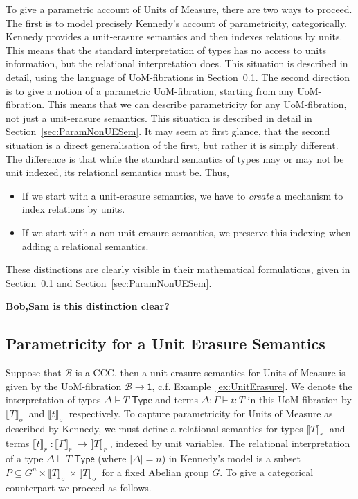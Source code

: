 \documentclass[a4paper,UKenglish]{lipics}
\newcommand{\UoM}{Units of Measure\xspace}
\newcommand{\msf}[1]{\mathsf{#1}} %
\newcommand{\terminal}{\msf{1}}
\newcommand{\B}{\mathcal{B}}
\newcommand{\semo}[1]{\ensuremath{\llbracket #1 \rrbracket _o} \;}
\newcommand{\semr}[1]{\ensuremath{\llbracket #1 \rrbracket _r} \;}
\newcommand{\UoMtype}{\Delta \vdash T \; \msf{ Type}}
\begin{document}
To give a parametric account of \UoM, there are two ways to proceed. The first is to model precisely Kennedy's account of parametricity, categorically. Kennedy provides a unit-erasure semantics and then indexes relations by units. This means that the standard interpretation of types has no access to units information, but the relational interpretation does. This situation is described in detail, using the language of UoM-fibrations in Section~\ref{sec:ParamUESem}. The second direction is to give a notion of a parametric UoM-fibration, starting from any UoM-fibration. This means that we can describe parametricity for any UoM-fibration, not just a unit-erasure semantics. This situation is described in detail in Section~\ref{sec:ParamNonUESem}. It may seem at first glance, that the second situation is a direct generalisation of the first, but rather it is simply different. The difference is that while the standard semantics of types may or may not be unit indexed, its relational semantics must be. Thus,
\begin{itemize}
 \item If we start with a unit-erasure semantics, we have to \emph{create} a mechanism to index relations by units.
 \item If we start with a non-unit-erasure semantics, we preserve this indexing when adding a relational semantics.
\end{itemize}
These distinctions are clearly visible in their mathematical formulations, given in Section~\ref{sec:ParamUESem} and Section~\ref{sec:ParamNonUESem}.

\textbf{Bob,Sam is this distinction clear?}



\subsection{Parametricity for a Unit Erasure Semantics}
\label{sec:ParamUESem}
Suppose that $\B$ is a CCC, then a unit-erasure semantics for \UoM is given by the UoM-fibration $\B \rightarrow \terminal$, c.f. Example~\ref{ex:UnitErasure}. We denote the interpretation of types $\UoMtype$ and terms $\Delta ; \Gamma \vdash t:T$ in this UoM-fibration by $\semo{T}$ and $\semo{t}$ respectively. To capture parametricity for \UoM as described by Kennedy, we must define a relational semantics for types $\semr{T}$ and terms $\semr{t} : \semr{\Gamma} \rightarrow \semr{T}$, indexed by unit variables. The relational interpretation of a type $\UoMtype$ (where $|\Delta| = n$) in Kennedy's model is a subset $P \subseteq G^n \times \semo{T} \times \semo{T}$ for a fixed Abelian group $G$. To give a categorical counterpart we proceed as follows.
\end{document}

